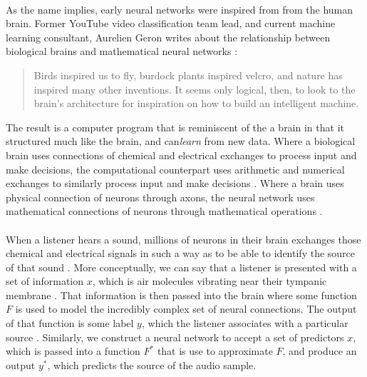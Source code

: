 \documentclass[12pt,letterpaper]{article}
\begin{document}
\paragraph*{}As the name implies, early neural networks were inspired from from the human brain. Former YouTube video classification team lead, and current machine learning consultant, Aurelien Geron writes about the relationship between biological brains and mathematical neural networks \cite{Geron}: 
\begin{quote}
Birds inspired us to fly, burdock plants inspired velcro, and nature has inspired many other inventions. It seems only logical, then, to look to the brain's architecture for inspiration on how to build an intelligent machine.
\end{quote}
The result is a computer program that is reminiscent of the a brain in that it structured much like the brain, and can\textit{learn} from new data. Where a biological brain uses connections of chemical and electrical exchanges to process input and make decisions, the computational counterpart uses arithmetic and numerical exchanges to similarly process input and make decisions \cite{Levine,Bishop}. Where a brain uses physical connection of neurons through axons, the neural network uses mathematical connections of neurons through mathematical operations \cite{Geron,Levine}.

\paragraph*{}When a listener hears a sound, millions of neurons in their brain exchanges those chemical and electrical signals in such a way as to be able to identify the source of that sound \cite{Geron,Virtanen}. More conceptually, we can say that a listener is presented with a set of information $x$, which is air molecules vibrating near their tympanic membrane \cite{White,Olson}. That information is then passed into the brain where some function $F$ is used to model the incredibly complex set of neural connections. The output of that function is some label $y$, which the listener associates with a particular source \cite{Olson}. Similarly, we construct a neural network to accept a set of predictors $x$, which is passed into a function $F^*$ that is use to approximate $F$, and produce an output $y^*$, which predicts the source of the audio sample.
\end{document}
